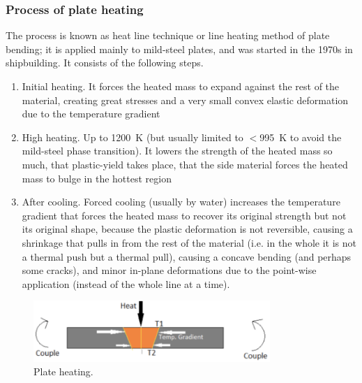 \subsubsection{Process of plate heating}
The process is known as heat line technique or line heating method of plate bending; it is applied mainly to mild-steel plates, and was started in the 1970s in shipbuilding. It consists of the following steps.
\begin{enumerate}
    \item Initial heating. It forces the heated mass to expand against the rest of the material, creating great stresses and a very small convex elastic deformation due to the temperature gradient
    \item High heating. Up to \SI{1200}{\kelvin} (but usually limited to $<$\SI{995}{\kelvin} to avoid the mild-steel phase transition). It lowers the strength of the heated mass so much, that plastic-yield takes place, that the side material forces the heated mass to bulge in the hottest region
    \item After cooling. Forced cooling (usually by water) increases the temperature gradient that forces the heated mass to recover its original strength but not its original shape, because the plastic deformation is not reversible, causing a shrinkage that pulls in from the rest of the material (i.e. in the whole it is not a thermal push but a thermal pull), causing a concave bending (and perhaps some cracks), and minor in-plane deformations due to the point-wise application (instead of the whole line at a time).
\end{enumerate}
\begin{figure}[H]
    \centering
    \includegraphics[width = 0.8\textwidth]{img/figure51.png}
    \caption{Plate heating.}
\end{figure}
